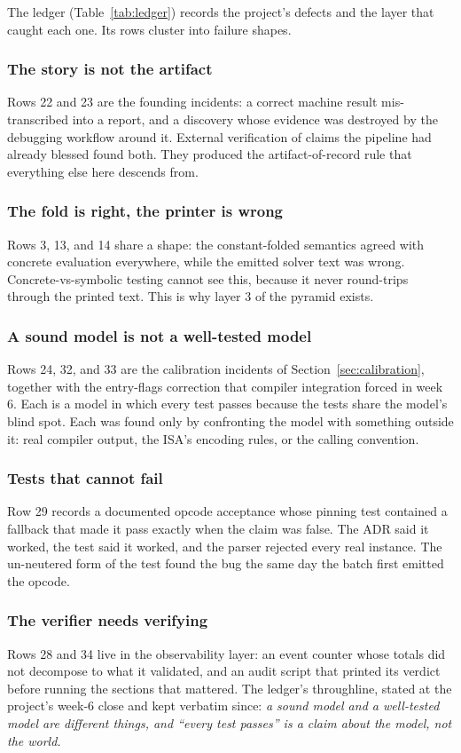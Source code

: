 \documentclass[journal,10pt]{IEEEtran}
\begin{document}
The ledger (Table~\ref{tab:ledger}) records the project's defects and
the layer that caught each one. Its rows cluster into failure shapes.

\subsubsection{The story is not the artifact}
Rows 22 and 23 are the founding incidents: a correct machine result
mis-transcribed into a report, and a discovery whose evidence was
destroyed by the debugging workflow around it. External verification
of claims the pipeline had already blessed found both. They produced
the artifact-of-record rule that everything else here descends from.

\subsubsection{The fold is right, the printer is wrong}
Rows 3, 13, and 14 share a shape: the constant-folded semantics agreed
with concrete evaluation everywhere, while the emitted solver text was
wrong. Concrete-vs-symbolic testing cannot see this, because it never
round-trips through the printed text. This is why layer 3 of the
pyramid exists.

\subsubsection{A sound model is not a well-tested model}
Rows 24, 32, and 33 are the calibration incidents of
Section~\ref{sec:calibration}, together with the entry-flags
correction that compiler integration forced in week 6. Each is a model
in which every test passes because the tests share the model's blind
spot. Each was found only by confronting the model with something
outside it: real compiler output, the ISA's encoding rules, or the
calling convention.

\subsubsection{Tests that cannot fail}
Row 29 records a documented opcode acceptance whose pinning test
contained a fallback that made it pass exactly when the claim was
false. The ADR said it worked, the test said it worked, and the parser
rejected every real instance. The un-neutered form of the test found
the bug the same day the batch first emitted the opcode.

\subsubsection{The verifier needs verifying}
Rows 28 and 34 live in the observability layer: an event counter whose
totals did not decompose to what it validated, and an audit script
that printed its verdict before running the sections that mattered.
The ledger's throughline, stated at the project's week-6 close and
kept verbatim since: \emph{a sound model and a well-tested model are
different things, and ``every test passes'' is a claim about the
model, not the world.}
\end{document}
